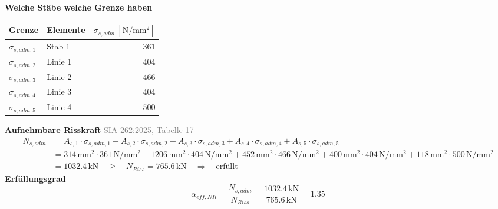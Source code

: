 \documentclass[11pt,a4paper]{article}
\newcommand{\normref}[1]{{\small\textcolor{gray}{#1}}}
\begin{document}
\noindent\textbf{Welche Stäbe welche Grenze haben}
\begin{longtable}{llr}
\hline
Grenze & Elemente & $\sigma_{s,adm}\ [\mathrm{N/mm^2}]$ \\
\hline
\endhead
$\sigma_{s,adm,1}$ & Stab 1 & $361$ \\
$\sigma_{s,adm,2}$ & Linie 1 & $404$ \\
$\sigma_{s,adm,3}$ & Linie 2 & $466$ \\
$\sigma_{s,adm,4}$ & Linie 3 & $404$ \\
$\sigma_{s,adm,5}$ & Linie 4 & $500$ \\
\hline
\end{longtable}
\noindent\textbf{Aufnehmbare Risskraft} \hfill \normref{SIA 262:2025, Tabelle 17}
\begin{equation*}
\begin{aligned}
  N_{s,adm} &= A_{s,1} \cdot \sigma_{s,adm,1} + A_{s,2} \cdot \sigma_{s,adm,2} + A_{s,3} \cdot \sigma_{s,adm,3} + A_{s,4} \cdot \sigma_{s,adm,4} + A_{s,5} \cdot \sigma_{s,adm,5} \\
  &= 314\,\mathrm{mm}^{2} \cdot 361\,\mathrm{N}/\mathrm{mm}^{2} + 1206\,\mathrm{mm}^{2} \cdot 404\,\mathrm{N}/\mathrm{mm}^{2} + 452\,\mathrm{mm}^{2} \cdot 466\,\mathrm{N}/\mathrm{mm}^{2} + 400\,\mathrm{mm}^{2} \cdot 404\,\mathrm{N}/\mathrm{mm}^{2} + 118\,\mathrm{mm}^{2} \cdot 500\,\mathrm{N}/\mathrm{mm}^{2} \\
  &= 1032.4\,\mathrm{kN} \quad \ge \quad N_{Riss} = 765.6\,\mathrm{kN} \quad \Rightarrow \quad \text{erfüllt}
\end{aligned}
\end{equation*}
\noindent\textbf{Erfüllungsgrad}
\begin{equation*}
\alpha_{eff,NR} = \frac{N_{s,adm}}{N_{Riss}} = \frac{1032.4\,\mathrm{kN}}{765.6\,\mathrm{kN}} = 1.35
\end{equation*}
\end{document}
